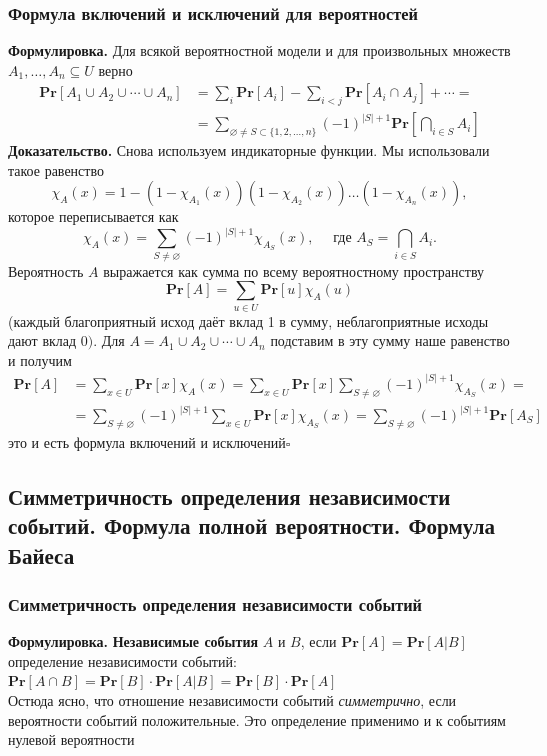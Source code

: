 \documentclass[a4paper]{article}
\newcommand{\qed}{\hfill$\square$}
\begin{document}
\subsubsection*{Формула включений и исключений для вероятностей}
\textbf{Формулировка.} Для всякой вероятностной модели и для произвольных множеств $A_1, \ldots, A_n \subseteq U$ верно $$
\begin{aligned}
\textbf{Pr}\left[A_1 \cup A_2 \cup \cdots \cup A_n\right] & =\sum_i \textbf{Pr}\left[A_i\right]-\sum_{i<j} \textbf{Pr}\left[A_i \cap A_j\right]+\cdots= \\
& =\sum_{\varnothing \neq S \subset\{1,2, \ldots, n\}}(-1)^{|S|+1} \textbf{Pr}\left[\bigcap_{i \in S} A_i\right]
\end{aligned}$$
\indent\textbf{Доказательство.} Снова используем индикаторные функции. Мы использовали такое равенство $$
\chi_A(x)=1-\left(1-\chi_{A_1}(x)\right)\left(1-\chi_{A_2}(x)\right) \ldots\left(1-\chi_{A_n}(x)\right),
$$
которое переписывается как
$$\chi_A(x)=\sum_{S \neq \varnothing}(-1)^{|S|+1} \chi_{A_S}(x), \quad \text { где } A_S=\bigcap_{i \in S} A_i .$$
Вероятность $A$ выражается как сумма по всему вероятностному пространству
$$\textbf{Pr}[A]=\sum_{u \in U} \textbf{Pr}[u] \chi_A(u)$$
(каждый благоприятный исход даёт вклад 1 в сумму, неблагоприятные исходы дают вклад 0$)$.
Для $A=A_1 \cup A_2 \cup \cdots \cup A_n$ подставим в эту сумму наше равенство и получим
$$
\begin{aligned}
\textbf{Pr}[A] & =\sum_{x \in U} \textbf{Pr}[x] \chi_A(x)=\sum_{x \in U} \textbf{Pr}[x] \sum_{S \neq \varnothing}(-1)^{|S|+1} \chi_{A_S}(x)= \\
& =\sum_{S \neq \varnothing}(-1)^{|S|+1} \sum_{x \in U} \textbf{Pr}[x] \chi_{A_S}(x)=\sum_{S \neq \varnothing}(-1)^{|S|+1} \textbf{Pr}\left[A_S\right]
\end{aligned}
$$
это и есть формула включений и исключений\qed
\label{2.34}


\subsection{Симметричность определения независимости событий. Формула полной вероятности. Формула Байеса}
\subsubsection*{Симметричность определения независимости событий}
\textbf{Формулировка.} \textbf{Независимые события} $A$ и $B$, если $\boxed{\textbf{Pr}[A]=\textbf{Pr}[A|B]}$\\[2mm]
 определение независимости событий:
$\boxed{\textbf{Pr}[A \cap B]=\textbf{Pr}[B] \cdot \textbf{Pr}[A|B]=\textbf{Pr}[B] \cdot \textbf{Pr}[A]}$\\[2mm]
\indent Остюда ясно, что отношение независимости событий \textit{симметрично}, если вероятности событий положительные. Это определение применимо и к событиям нулевой вероятности
\end{document}
